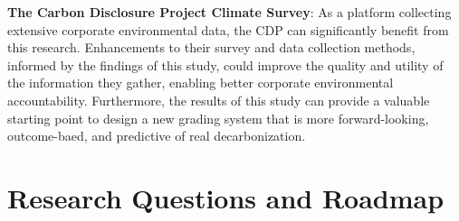 \textbf{The Carbon Disclosure Project Climate Survey}: As a platform collecting extensive corporate environmental data, the CDP can significantly benefit from this research. Enhancements to their survey and data collection methods, informed by the findings of this study, could improve the quality and utility of the information they gather, enabling better corporate environmental accountability. Furthermore, the results of this study can provide a valuable starting point to design a new grading system that is more forward-looking, outcome-baed, and predictive of real decarbonization.


\section{Research Questions and Roadmap}

